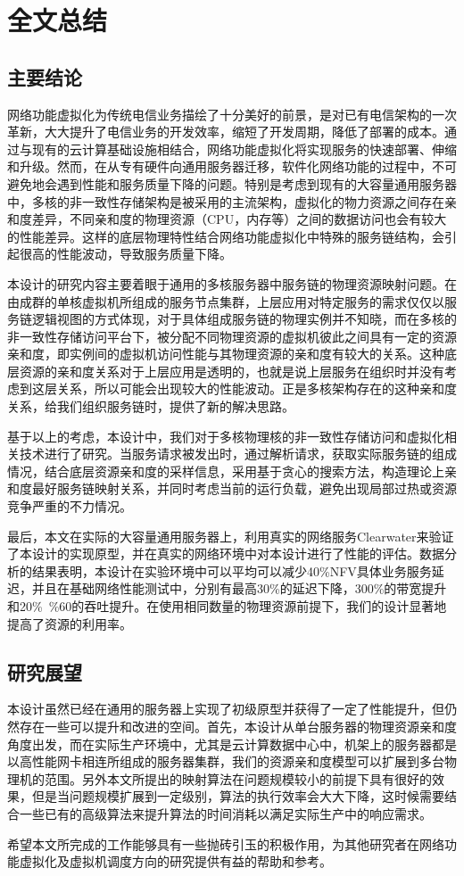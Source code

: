 \chapter{全文总结}
\label{chapter:conclusion}

\section{主要结论}
网络功能虚拟化为传统电信业务描绘了十分美好的前景，是对已有电信架构的一次革新，大大提升了电信业务的开发效率，缩短了开发周期，降低了部署的成本。通过与现有的云计算基础设施相结合，网络功能虚拟化将实现服务的快速部署、伸缩和升级。然而，在从专有硬件向通用服务器迁移，软件化网络功能的过程中，不可避免地会遇到性能和服务质量下降的问题。特别是考虑到现有的大容量通用服务器中，多核的非一致性存储架构是被采用的主流架构，虚拟化的物力资源之间存在亲和度差异，不同亲和度的物理资源（CPU，内存等）之间的数据访问也会有较大的性能差异。这样的底层物理特性结合网络功能虚拟化中特殊的服务链结构，会引起很高的性能波动，导致服务质量下降。

本设计的研究内容主要着眼于通用的多核服务器中服务链的物理资源映射问题。在由成群的单核虚拟机所组成的服务节点集群，上层应用对特定服务的需求仅仅以服务链逻辑视图的方式体现，对于具体组成服务链的物理实例并不知晓，而在多核的非一致性存储访问平台下，被分配不同物理资源的虚拟机彼此之间具有一定的资源亲和度，即实例间的虚拟机访问性能与其物理资源的亲和度有较大的关系。这种底层资源的亲和度关系对于上层应用是透明的，也就是说上层服务在组织时并没有考虑到这层关系，所以可能会出现较大的性能波动。正是多核架构存在的这种亲和度关系，给我们组织服务链时，提供了新的解决思路。

基于以上的考虑，本设计中，我们对于多核物理核的非一致性存储访问和虚拟化相关技术进行了研究。当服务请求被发出时，通过解析请求，获取实际服务链的组成情况，结合底层资源亲和度的采样信息，采用基于贪心的搜索方法，构造理论上亲和度最好服务链映射关系，并同时考虑当前的运行负载，避免出现局部过热或资源竞争严重的不力情况。

最后，本文在实际的大容量通用服务器上，利用真实的网络服务Clearwater来验证了本设计的实现原型，并在真实的网络环境中对本设计进行了性能的评估。数据分析的结果表明，本设计在实验环境中可以平均可以减少40\%NFV具体业务服务延迟，并且在基础网络性能测试中，分别有最高30\%的延迟下降，300\%的带宽提升和20\%~\%60的吞吐提升。在使用相同数量的物理资源前提下，我们的设计显著地提高了资源的利用率。

\section{研究展望}
本设计虽然已经在通用的服务器上实现了初级原型并获得了一定了性能提升，但仍然存在一些可以提升和改进的空间。首先，本设计从单台服务器的物理资源亲和度角度出发，而在实际生产环境中，尤其是云计算数据中心中，机架上的服务器都是以高性能网卡相连所组成的服务器集群，我们的资源亲和度模型可以扩展到多台物理机的范围。另外本文所提出的映射算法在问题规模较小的前提下具有很好的效果，但是当问题规模扩展到一定级别，算法的执行效率会大大下降，这时候需要结合一些已有的高级算法来提升算法的时间消耗以满足实际生产中的响应需求。

希望本文所完成的工作能够具有一些抛砖引玉的积极作用，为其他研究者在网络功能虚拟化及虚拟机调度方向的研究提供有益的帮助和参考。
